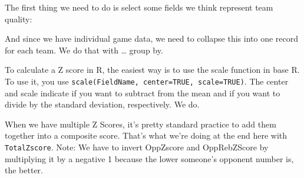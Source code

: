 \documentclass[]{book}
\newenvironment{Shaded}{\begin{snugshade}}{\end{snugshade}}
\newcommand{\DataTypeTok}[1]{\textcolor[rgb]{0.13,0.29,0.53}{#1}}
\newcommand{\KeywordTok}[1]{\textcolor[rgb]{0.13,0.29,0.53}{\textbf{#1}}}
\newcommand{\NormalTok}[1]{#1}
\newcommand{\OperatorTok}[1]{\textcolor[rgb]{0.81,0.36,0.00}{\textbf{#1}}}
\newcommand{\StringTok}[1]{\textcolor[rgb]{0.31,0.60,0.02}{#1}}
\begin{document}
The first thing we need to do is select some fields we think represent team quality:

\begin{Shaded}
\end{Shaded}

And since we have individual game data, we need to collapse this into one record for each team. We do that with \ldots{} group by.

\begin{Shaded}
\end{Shaded}

To calculate a Z score in R, the easiest way is to use the scale function in base R. To use it, you use \texttt{scale(FieldName,\ center=TRUE,\ scale=TRUE)}. The center and scale indicate if you want to subtract from the mean and if you want to divide by the standard deviation, respectively. We do.

When we have multiple Z Scores, it's pretty standard practice to add them together into a composite score. That's what we're doing at the end here with \texttt{TotalZscore}. Note: We have to invert OppZscore and OppRebZScore by multiplying it by a negative 1 because the lower someone's opponent number is, the better.
\end{document}
